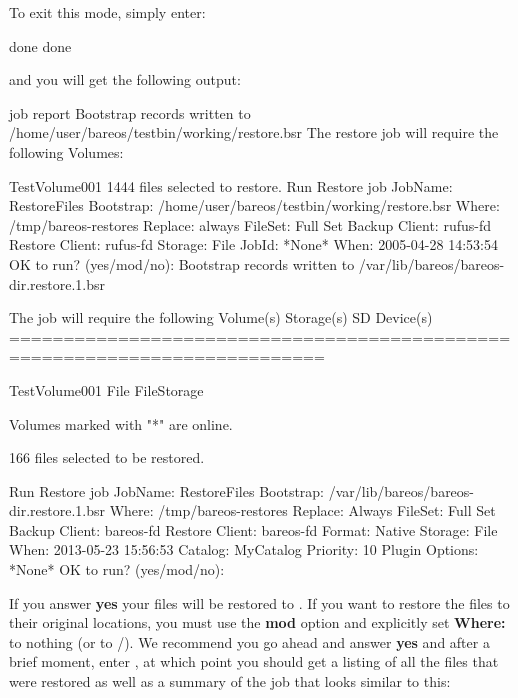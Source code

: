 To exit this mode, simply enter:

\footnotesize
\begin{bconsole}{done}
done
\end{bconsole}
\normalsize

and you will get the following output:

\footnotesize
\begin{bconsole}{job report}
Bootstrap records written to
   /home/user/bareos/testbin/working/restore.bsr
The restore job will require the following Volumes:

   TestVolume001
1444 files selected to restore.
Run Restore job
JobName:         RestoreFiles
Bootstrap:      /home/user/bareos/testbin/working/restore.bsr
Where:          /tmp/bareos-restores
Replace:        always
FileSet:        Full Set
Backup Client:  rufus-fd
Restore Client: rufus-fd
Storage:        File
JobId:          *None*
When:           2005-04-28 14:53:54
OK to run? (yes/mod/no):
Bootstrap records written to /var/lib/bareos/bareos-dir.restore.1.bsr

The job will require the following
   Volume(s)                 Storage(s)                SD Device(s)
===========================================================================
   
    TestVolume001             File                      FileStorage

Volumes marked with "*" are online.


166 files selected to be restored.

Run Restore job
JobName:         RestoreFiles
Bootstrap:       /var/lib/bareos/bareos-dir.restore.1.bsr
Where:           /tmp/bareos-restores
Replace:         Always
FileSet:         Full Set
Backup Client:   bareos-fd
Restore Client:  bareos-fd
Format:          Native
Storage:         File
When:            2013-05-23 15:56:53
Catalog:         MyCatalog
Priority:        10
Plugin Options:  *None*
OK to run? (yes/mod/no): 
\end{bconsole}
\normalsize

If you answer {\bf yes} your files will be restored to
. If you want to restore the files to their original
locations, you must use the {\bf mod} option and explicitly set {\bf Where:}
to nothing (or to /). We recommend you go ahead and answer {\bf yes} and after
a brief moment, enter , at which point you should get a listing
of all the files that were restored as well as a summary of the job that looks
similar to this:

